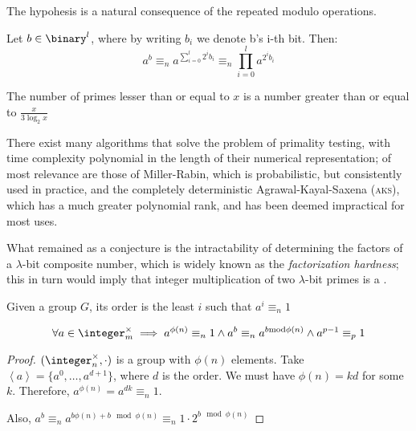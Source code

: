 The hypohesis is a natural consequence of the repeated modulo operations.

\begin{observation}
    Let $b \in \binary^l$, where by writing $b_i$ we denote b's i-th bit. Then:
    \[
        a^b \equiv_n a^{\sum_{i = 0}^l 2^ib_i} \equiv_n \prod_{i = 0}^l a^{2^ib_i} 
    \]
\end{observation}

\begin{theorem}
    The number of primes lesser than or equal to $x$ is a number greater than or equal to $\frac{x}{3\log_2 x}$
\end{theorem}

There exist many algorithms that solve the problem of primality testing, with time complexity polynomial in the length of their numerical representation; of most relevance are those of Miller-Rabin, which is probabilistic, but consistently used in practice, and the completely deterministic Agrawal-Kayal-Saxena (\textsc{aks}), which has a much greater polynomial rank, and has been deemed impractical for most uses.

What remained as a conjecture is the intractability of determining the factors of a $\lambda$-bit composite number, which is widely known as the \emph{factorization hardness}; this in turn would imply that integer multiplication of two $\lambda$-bit primes is a \owf.

\begin{definition}
    Given a group $G$, its order is the least $i$ such that $a^i \equiv_n 1$ 
\end{definition}

\begin{corollary}
    \[
        \forall a \in \integer_m^\times \implies a^{\phi(n)} \equiv_n 1 \wedge a^b \equiv_n a^{b \mod \phi(n)} \wedge a^{p - 1} \equiv_p 1
    \]
\end{corollary}

\begin{proof}
    $(\integer_n^\times, \cdot)$ is a group with $\phi(n)$ elements. Take $\left< a \right> = \{a^0, \dots, a^{d + 1}\}$, where $d$ is the order. We must have $\phi(n) = kd$ for some $k$. Therefore, $a^{\phi(n)} = a^{dk} \equiv_n 1$.

    Also, $a^b \equiv_n a^{b\phi(n) + b \mod \phi(n)} \equiv_n 1 \cdot 2^{b \mod \phi(n)}$
\end{proof}

